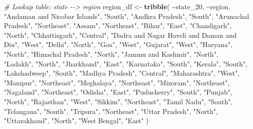 \documentclass[
]{article}
\newenvironment{Shaded}{\begin{snugshade}}{\end{snugshade}}
\newcommand{\CommentTok}[1]{\textcolor[rgb]{0.56,0.35,0.01}{\textit{#1}}}
\newcommand{\FunctionTok}[1]{\textcolor[rgb]{0.13,0.29,0.53}{\textbf{#1}}}
\newcommand{\NormalTok}[1]{#1}
\newcommand{\OtherTok}[1]{\textcolor[rgb]{0.56,0.35,0.01}{#1}}
\newcommand{\SpecialCharTok}[1]{\textcolor[rgb]{0.81,0.36,0.00}{\textbf{#1}}}
\newcommand{\StringTok}[1]{\textcolor[rgb]{0.31,0.60,0.02}{#1}}
\begin{document}
\begin{Shaded}
\begin{Highlighting}[]
\CommentTok{\# Lookup table: state {-}{-}\textgreater{} region}
\NormalTok{region\_df }\OtherTok{\textless{}{-}} \FunctionTok{tribble}\NormalTok{(}
  \SpecialCharTok{\textasciitilde{}}\NormalTok{state\_20, }\SpecialCharTok{\textasciitilde{}}\NormalTok{region,}
  \StringTok{"Andaman and Nicobar Islands"}\NormalTok{, }\StringTok{"South"}\NormalTok{,}
  \StringTok{"Andhra Pradesh"}\NormalTok{, }\StringTok{"South"}\NormalTok{,}
  \StringTok{"Arunachal Pradesh"}\NormalTok{, }\StringTok{"Northeast"}\NormalTok{,}
  \StringTok{"Assam"}\NormalTok{, }\StringTok{"Northeast"}\NormalTok{,}
  \StringTok{"Bihar"}\NormalTok{, }\StringTok{"East"}\NormalTok{,}
  \StringTok{"Chandigarh"}\NormalTok{, }\StringTok{"North"}\NormalTok{,}
  \StringTok{"Chhattisgarh"}\NormalTok{, }\StringTok{"Central"}\NormalTok{,}
  \StringTok{"Dadra and Nagar Haveli and Daman and Diu"}\NormalTok{, }\StringTok{"West"}\NormalTok{,}
  \StringTok{"Delhi"}\NormalTok{, }\StringTok{"North"}\NormalTok{,}
  \StringTok{"Goa"}\NormalTok{, }\StringTok{"West"}\NormalTok{,}
  \StringTok{"Gujarat"}\NormalTok{, }\StringTok{"West"}\NormalTok{,}
  \StringTok{"Haryana"}\NormalTok{, }\StringTok{"North"}\NormalTok{,}
  \StringTok{"Himachal Pradesh"}\NormalTok{, }\StringTok{"North"}\NormalTok{,}
  \StringTok{"Jammu and Kashmir"}\NormalTok{, }\StringTok{"North"}\NormalTok{,}
  \StringTok{"Ladakh"}\NormalTok{, }\StringTok{"North"}\NormalTok{,}
  \StringTok{"Jharkhand"}\NormalTok{, }\StringTok{"East"}\NormalTok{,}
  \StringTok{"Karnataka"}\NormalTok{, }\StringTok{"South"}\NormalTok{,}
  \StringTok{"Kerala"}\NormalTok{, }\StringTok{"South"}\NormalTok{,}
  \StringTok{"Lakshadweep"}\NormalTok{, }\StringTok{"South"}\NormalTok{,}
  \StringTok{"Madhya Pradesh"}\NormalTok{, }\StringTok{"Central"}\NormalTok{,}
  \StringTok{"Maharashtra"}\NormalTok{, }\StringTok{"West"}\NormalTok{,}
  \StringTok{"Manipur"}\NormalTok{, }\StringTok{"Northeast"}\NormalTok{,}
  \StringTok{"Meghalaya"}\NormalTok{, }\StringTok{"Northeast"}\NormalTok{,}
  \StringTok{"Mizoram"}\NormalTok{, }\StringTok{"Northeast"}\NormalTok{,}
  \StringTok{"Nagaland"}\NormalTok{, }\StringTok{"Northeast"}\NormalTok{,}
  \StringTok{"Odisha"}\NormalTok{, }\StringTok{"East"}\NormalTok{,}
  \StringTok{"Puducherry"}\NormalTok{, }\StringTok{"South"}\NormalTok{,}
  \StringTok{"Punjab"}\NormalTok{, }\StringTok{"North"}\NormalTok{,}
  \StringTok{"Rajasthan"}\NormalTok{, }\StringTok{"West"}\NormalTok{,}
  \StringTok{"Sikkim"}\NormalTok{, }\StringTok{"Northeast"}\NormalTok{,}
  \StringTok{"Tamil Nadu"}\NormalTok{, }\StringTok{"South"}\NormalTok{,}
  \StringTok{"Telangana"}\NormalTok{, }\StringTok{"South"}\NormalTok{,}
  \StringTok{"Tripura"}\NormalTok{, }\StringTok{"Northeast"}\NormalTok{,}
  \StringTok{"Uttar Pradesh"}\NormalTok{, }\StringTok{"North"}\NormalTok{,}
  \StringTok{"Uttarakhand"}\NormalTok{, }\StringTok{"North"}\NormalTok{,}
  \StringTok{"West Bengal"}\NormalTok{, }\StringTok{"East"}
\NormalTok{)}


\end{Highlighting}
\end{Shaded}
\end{document}
